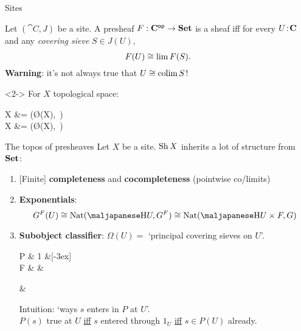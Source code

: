 \begin{frame}{Sites}
	\begin{definition}
		Let $(\cat C, J)$ be a site.
		A presheaf $F : \mathbf{C}^{\mathsf{op}} \to \mathbf{Set}$ is a sheaf iff for every $U \!:\! \mathbf{C}$ and any \emph{covering sieve} $S \in J(U)$,
		\begin{equation*}
			F(U) \overset{}{\cong} \lim F(S).
		\end{equation*}
		\textbf{Warning}: it's not always true that $U \overset{}{\cong} \operatorname*{colim} S$!
	\end{definition}

	\begin{example}<2->
		For $X$ topological space:
		\begin{eqalign*}
			\Sh X  &= \Sh (\O(X),\, )\\
			\Psh X &= \Sh (\O(X),\, )
		\end{eqalign*}
	\end{example}
\end{frame}

\begin{frame}{The topos of presheaves}
	Let $X$ be a site. $\operatorname{Sh} X$ inherits a lot of structure from $\mathbf{Set}$:
	\begin{enumerate}
		\item {[Finite]} \textbf{completeness} and \textbf{cocompleteness} (pointwise co/limits)
		\item \textbf{Exponentials}:
		\begin{equation*}
			G^F(U) \iso \Nat(\yo U, G^F) \iso \Nat(\yo U \times F, G)
		\end{equation*}
		\item \textbf{Subobject classifier}: $\Omega(U) =$ `principal covering sieves on $U$'.
		\begin{diagram*}
			P   \& 1  \&[-3ex] \color{colornote}{*} \\
			F  \& \Omega \& \color{colornote}{1_U}
		\end{diagram*}
		\begin{diagram*}
			\phantom{XXX} \color{colornote}{s \in F(U)}  \& \color{colornote}{\{ V \nto{f} U \suchthat s\vert_f \in P(V) \}}
		\end{diagram*}%
		Intuition: `ways $s$ enters in $P$ at $U$'.\\
		$P(s)$ true at $U$ \underline{iff} $s$ entered through $1_U$ \underline{iff} $s \in P(U)$ already.
	\end{enumerate}
\end{frame}

